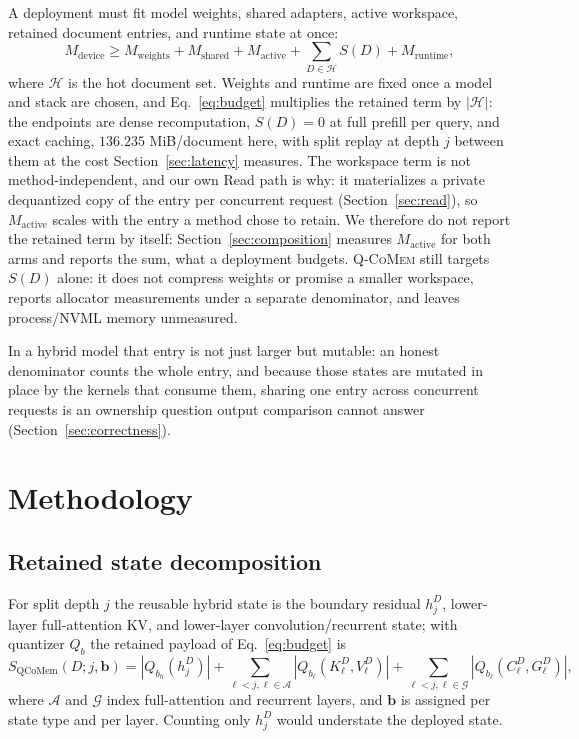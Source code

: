 \documentclass{article}
\newcommand{\qcomem}{\textsc{Q-CoMem}}
\begin{document}
A deployment must fit model weights, shared adapters, active workspace, retained
document entries, and runtime state at once:
\begin{equation}
 M_{\mathrm{device}} \geq M_{\mathrm{weights}}+M_{\mathrm{shared}}
 +M_{\mathrm{active}}+\sum_{D\in\mathcal{H}}S(D)+M_{\mathrm{runtime}},
 \label{eq:budget}
\end{equation}
where $\mathcal{H}$ is the hot document set.  Weights and runtime are fixed once
a model and stack are chosen, and Eq.~\ref{eq:budget} multiplies the retained
term by $|\mathcal{H}|$: the endpoints are dense recomputation, $S(D)=0$ at full
prefill per query, and exact caching, $136.235$ MiB/document here, with split
replay at depth $j$ between them at the cost Section~\ref{sec:latency} measures.
The workspace term is not
method-independent, and our own Read path is why: it materializes a private
dequantized copy of the entry per concurrent request (Section~\ref{sec:read}),
so $M_{\mathrm{active}}$ scales with the entry a method chose to retain.  We
therefore do not report the retained term by itself:
Section~\ref{sec:composition} measures $M_{\mathrm{active}}$ for both arms and
reports the sum, what a deployment budgets.  \qcomem{} still targets
$S(D)$ alone: it does not compress weights or promise a smaller workspace,
reports allocator measurements under a separate denominator, and leaves
process/NVML memory unmeasured.

In a hybrid model that entry is not just larger but mutable: an honest
denominator counts the whole entry, and because those states are mutated in
place by the kernels that consume them, sharing one entry across concurrent
requests is an ownership question output comparison cannot answer
(Section~\ref{sec:correctness}).

\section{Methodology}
\label{sec:method}

\subsection{Retained state decomposition}
\label{sec:decomposition}

For split depth $j$ the reusable hybrid state is the boundary residual
$h_j^D$, lower-layer full-attention KV, and lower-layer convolution/recurrent
state; with quantizer $Q_b$ the retained payload of Eq.~\ref{eq:budget} is
\begin{equation}
 S_{\mathrm{QCoMem}}(D;j,\mathbf b)=|Q_{b_h}(h_j^D)|+
 \sum_{\ell<j,\ell\in\mathcal A}|Q_{b_\ell}(K^D_\ell,V^D_\ell)|+
 \sum_{\ell<j,\ell\in\mathcal G}|Q_{b_\ell}(C^D_\ell,G^D_\ell)|,
\end{equation}
where $\mathcal A$ and $\mathcal G$ index full-attention and recurrent layers, and
$\mathbf b$ is assigned per state type and per layer.  Counting only $h_j^D$
would understate the deployed state.
\end{document}
